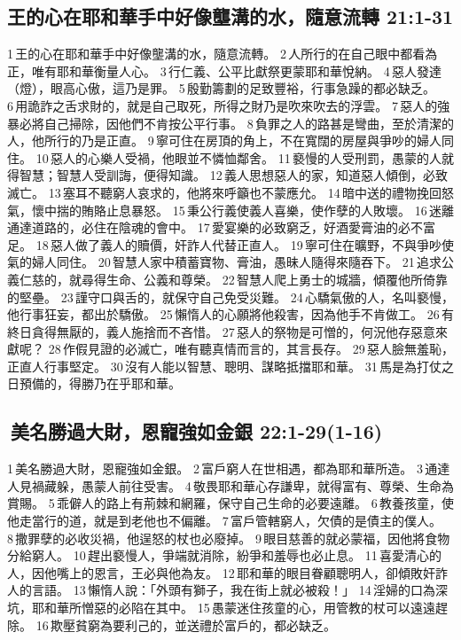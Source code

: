 \subsection{王的心在耶和華手中好像壟溝的水，隨意流轉 21:1-31}
1 王的心在耶和華手中好像壟溝的水，隨意流轉。 2 人所行的在自己眼中都看為正，唯有耶和華衡量人心。 3 行仁義、公平比獻祭更蒙耶和華悅納。 4 惡人發達（燈），眼高心傲，這乃是罪。 5 殷勤籌劃的足致豐裕，行事急躁的都必缺乏。 6 用詭詐之舌求財的，就是自己取死，所得之財乃是吹來吹去的浮雲。 7 惡人的強暴必將自己掃除，因他們不肯按公平行事。 8 負罪之人的路甚是彎曲，至於清潔的人，他所行的乃是正直。 9 寧可住在房頂的角上，不在寬闊的房屋與爭吵的婦人同住。 10 惡人的心樂人受禍，他眼並不憐恤鄰舍。 11 褻慢的人受刑罰，愚蒙的人就得智慧；智慧人受訓誨，便得知識。 12 義人思想惡人的家，知道惡人傾倒，必致滅亡。 13 塞耳不聽窮人哀求的，他將來呼籲也不蒙應允。 14 暗中送的禮物挽回怒氣，懷中揣的賄賂止息暴怒。 15 秉公行義使義人喜樂，使作孽的人敗壞。 16 迷離通達道路的，必住在陰魂的會中。 17 愛宴樂的必致窮乏，好酒愛膏油的必不富足。 18 惡人做了義人的贖價，奸詐人代替正直人。 19 寧可住在曠野，不與爭吵使氣的婦人同住。 20 智慧人家中積蓄寶物、膏油，愚昧人隨得來隨吞下。 21 追求公義仁慈的，就尋得生命、公義和尊榮。 22 智慧人爬上勇士的城牆，傾覆他所倚靠的堅壘。 23 謹守口與舌的，就保守自己免受災難。 24 心驕氣傲的人，名叫褻慢，他行事狂妄，都出於驕傲。 25 懶惰人的心願將他殺害，因為他手不肯做工。 26 有終日貪得無厭的，義人施捨而不吝惜。 27 惡人的祭物是可憎的，何況他存惡意來獻呢？ 28 作假見證的必滅亡，唯有聽真情而言的，其言長存。 29 惡人臉無羞恥，正直人行事堅定。 30 沒有人能以智慧、聰明、謀略抵擋耶和華。 31 馬是為打仗之日預備的，得勝乃在乎耶和華。



\subsection{ 美名勝過大財，恩寵強如金銀 22:1-29(1-16)}
1 美名勝過大財，恩寵強如金銀。 2 富戶窮人在世相遇，都為耶和華所造。 3 通達人見禍藏躲，愚蒙人前往受害。 4 敬畏耶和華心存謙卑，就得富有、尊榮、生命為賞賜。 5 乖僻人的路上有荊棘和網羅，保守自己生命的必要遠離。 6 教養孩童，使他走當行的道，就是到老他也不偏離。 7 富戶管轄窮人，欠債的是債主的僕人。 8 撒罪孽的必收災禍，他逞怒的杖也必廢掉。 9 眼目慈善的就必蒙福，因他將食物分給窮人。 10 趕出褻慢人，爭端就消除，紛爭和羞辱也必止息。 11 喜愛清心的人，因他嘴上的恩言，王必與他為友。 12 耶和華的眼目眷顧聰明人，卻傾敗奸詐人的言語。 13 懶惰人說：「外頭有獅子，我在街上就必被殺！」 14 淫婦的口為深坑，耶和華所憎惡的必陷在其中。 15 愚蒙迷住孩童的心，用管教的杖可以遠遠趕除。 16 欺壓貧窮為要利己的，並送禮於富戶的，都必缺乏。


